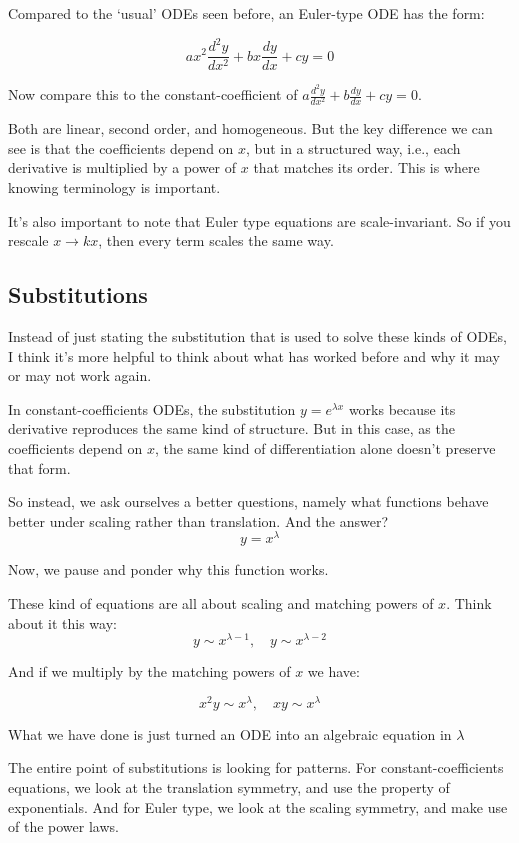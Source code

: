 Compared to the `usual' ODEs seen before, an Euler-type ODE has the form: 

$$
ax^2 \frac{d^2y}{dx^2} + bx \frac{dy}{dx} + cy = 0
$$

Now compare this to the constant-coefficient of $a\frac{d^2y}{dx^2} + b \frac{dy}{dx} + cy = 0$. 

Both are linear, second order, and homogeneous. But the key difference we can see is that the coefficients depend on $x$, but in a structured way, i.e., each derivative is multiplied by a power of $x$ that matches its order. This is where knowing terminology is important. 

It's also important to note that Euler type equations are scale-invariant. So if you rescale $x \rightarrow kx$, then every term scales the same way. 

\subsection{Substitutions}

Instead of just stating the substitution that is used to solve these kinds of ODEs, I think it's more helpful to think about what has worked before and why it may or may not work again. 

In constant-coefficients ODEs, the substitution $y = e^{\lambda x}$ works because its derivative reproduces the same kind of structure. But in this case, as the coefficients depend on $x$, the same kind of differentiation alone doesn't preserve that form. 

So instead, we ask ourselves a better questions, namely what functions behave better under scaling rather than translation. And the answer? $$y = x^{\lambda}$$

Now, we pause and ponder why this function works. 

These kind of equations are all about scaling and matching powers of $x$. Think about it this way: 
$$
y \sim x^{\lambda - 1}, \quad  y \sim x^{\lambda - 2}
$$

And if we multiply by the matching powers of $x$ we have: 

$$
x^2y \sim x^{\lambda}, \quad  xy \sim x^{\lambda}
$$

What we have done is just turned an ODE into an algebraic equation in $\lambda$ 


The entire point of substitutions is looking for patterns. For constant-coefficients equations, we look at the translation symmetry, and use the property of exponentials. And for Euler type, we look at the scaling symmetry, and make use of the power laws. 



